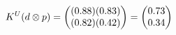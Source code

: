 \documentclass[preview]{standalone}
\begin{document}
\begin{align*}
\special{dvisvgm:raw <g id='unique000'>}K^U(d \otimes p) = \begin{pmatrix} (0.88)(0.83) \\ (0.82)(0.42) \end{pmatrix} = \begin{pmatrix} 0.73 \\ 0.34 \end{pmatrix}\special{dvisvgm:raw </g>}
\end{align*}
\end{document}
